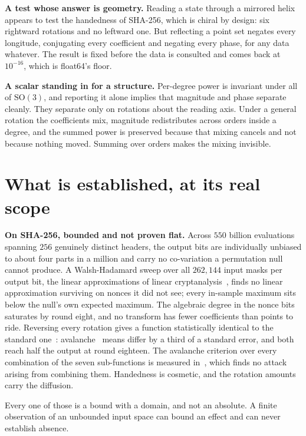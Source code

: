 \textbf{A test whose answer is geometry.} Reading a state through a mirrored helix appears to test the handedness of SHA-256, which is chiral by design: six rightward rotations and no leftward one. But reflecting a point set negates every longitude, conjugating every coefficient and negating every phase, for any data whatever. The result is fixed before the data is consulted and comes back at \(10^{-16}\), which is float64's floor.

\textbf{A scalar standing in for a structure.} Per-degree power is invariant under all of \(\mathrm{SO}(3)\), and reporting it alone implies that magnitude and phase separate cleanly. They separate only on rotations about the reading axis. Under a general rotation the coefficients mix, magnitude redistributes across orders inside a degree, and the summed power is preserved because that mixing cancels and not because nothing moved. Summing over orders makes the mixing invisible.

\section{What is established, at its real scope}

\textbf{On SHA-256, bounded and not proven flat.} Across \(550\) billion evaluations spanning \(256\) genuinely distinct headers, the output bits are individually unbiased to about four parts in a million and carry no co-variation a permutation null cannot produce. A Walsh-Hadamard sweep over all \(262{,}144\) input masks per output bit, the linear approximations of linear cryptanalysis~\cite{src:Matsui-1994}, finds no linear approximation surviving on nonces it did not see; every in-sample maximum sits below the null's own expected maximum. The algebraic degree in the nonce bits saturates by round eight, and no transform has fewer coefficients than points to ride. Reversing every rotation gives a function statistically identical to the standard one~\cite{src:FIPS-180-4}: avalanche~\cite{src:Webster-and-Tavares-1986} means differ by a third of a standard error, and both reach half the output at round eighteen. The avalanche criterion over every combination of the seven sub-functions is measured in~\cite{src:Vaughn-and-Borowczak-2026}, which finds no attack arising from combining them. Handedness is cosmetic, and the rotation amounts carry the diffusion.

Every one of those is a bound with a domain, and not an absolute. A finite observation of an unbounded input space can bound an effect and can never establish absence.

